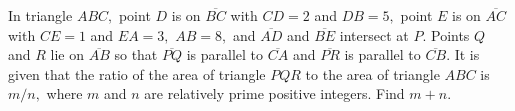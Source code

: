 In triangle $ABC,$ point $D$ is on $\overline{BC}$ with $CD=2$ and $DB=5,$ point $E$ is on $\overline{AC}$ with $CE=1$ and $EA=3,$ $AB=8,$ and $\overline{AD}$ and $\overline{BE}$ intersect at $P.$ Points $Q$ and $R$ lie on $\overline{AB}$ so that $\overline{PQ}$ is parallel to $\overline{CA}$ and $\overline{PR}$ is parallel to $\overline{CB}.$ It is given that the ratio of the area of triangle $PQR$ to the area of triangle $ABC$ is $m/n,$ where $m$ and $n$ are relatively prime positive integers. Find $m+n.$